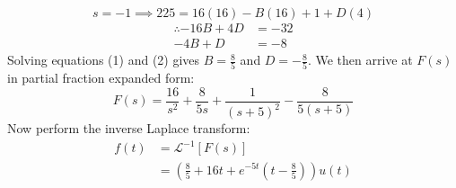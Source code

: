 \begin{enumerate}
{\begin{equation*}
			s = -1 \implies 225 = 16(16) - B(16) + 1 + D(4)
		\end{equation*}
		\begin{align}
			\therefore -16B + 4D &= -32 \nonumber \\
			-4B + D &= -8
		\end{align}
		Solving equations (1) and (2) gives $B = \frac{8}{5}$ and $D = -\frac{8}{5}$. We then arrive at $F(s)$ in partial fraction expanded form:
		\begin{equation*}
			F(s) = \frac{16}{s^2} + \frac{8}{5s} + \frac{1}{(s+5)^2} - \frac{8}{5(s+5)}
		\end{equation*}
		Now perform the inverse Laplace transform:
		\begin{align*}
			f(t) &= \mathcal{L}^{-1}[F(s)] \\
			&= \left(\frac{8}{5} + 16t + e^{-5t} \left(t - \frac{8}{5} \right) \right) u(t)
		\end{align*}
	}
	
\end{enumerate}
